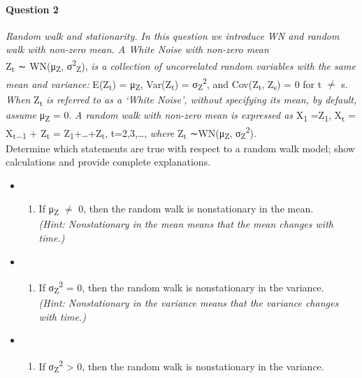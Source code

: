 \documentclass[
]{article}
\providecommand{\tightlist}{%
  \setlength{\itemsep}{0pt}\setlength{\parskip}{0pt}}
\begin{document}
\hypertarget{question-2}{%
\paragraph{Question 2}\label{question-2}}

\emph{Random walk and stationarity. In this question we introduce WN and
random walk with non-zero mean. A White Noise with non-zero mean}\\
Z\textsubscript{t} ∼ WN(μ\textsubscript{Z},
σ\textsuperscript{2}\textsubscript{Z}), \emph{is a collection of
uncorrelated random variables with the same mean and variance:}
E(Z\textsubscript{t}) = μ\textsubscript{Z}, Var(Z\textsubscript{t}) =
σ\textsubscript{Z}\textsuperscript{2}, and Cov(Z\textsubscript{t},
Z\textsubscript{s}) = 0 for t \(\ne\) s. \emph{When} Z\textsubscript{t}
\emph{is referred to as a `White Noise', without specifying its mean, by
default, assume} μ\textsubscript{Z} = 0. \emph{A random walk with
non-zero mean is expressed as} X\textsubscript{1} =Z\textsubscript{1},
X\textsubscript{t} = X\textsubscript{t−1} + Z\textsubscript{t} =
Z\textsubscript{1}+\ldots+Z\textsubscript{t}, t=2,3,\ldots, \emph{where}
Z\textsubscript{t} ∼WN(μ\textsubscript{Z},
σ\textsubscript{Z}\textsuperscript{2}).\\
Determine which statements are true with respect to a random walk model;
show calculations and provide complete explanations.~
\setlength{\leftskip}{2cm}

\begin{itemize}
\item
  \begin{enumerate}
  \def\labelenumi{\Roman{enumi}.}
  \tightlist
  \item
    If μ\textsubscript{Z} \(\neq\) 0, then the random walk is
    nonstationary in the mean.\\
    \emph{(Hint: Nonstationary in the mean means that the mean changes
    with time.)}
  \end{enumerate}
\item
  \begin{enumerate}
  \def\labelenumi{\Roman{enumi}.}
  \setcounter{enumi}{1}
  \tightlist
  \item
    If σ\textsubscript{Z}\textsuperscript{2} = 0, then the random walk
    is nonstationary in the variance.\\
    \emph{(Hint: Nonstationary in the variance means that the variance
    changes with time.)}
  \end{enumerate}
\item
  \begin{enumerate}
  \def\labelenumi{\Roman{enumi}.}
  \setcounter{enumi}{2}
  \tightlist
  \item
    If σ\textsubscript{Z}\textsuperscript{2} \textgreater{} 0, then the
    random walk is nonstationary in the variance.\\
  \end{enumerate}
\end{itemize}
\end{document}
